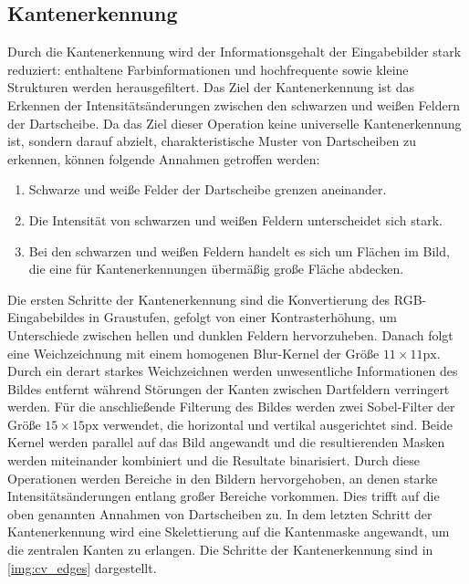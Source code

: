 
\subsection{Kantenerkennung}
\label{sec:impl:cv:edges}

Durch die Kantenerkennung wird der Informationsgehalt der Eingabebilder stark reduziert: enthaltene Farbinformationen und hochfrequente sowie kleine Strukturen werden herausgefiltert. Das Ziel der Kantenerkennung ist das Erkennen der Intensitätsänderungen zwischen den schwarzen und weißen Feldern der Dartscheibe. Da das Ziel dieser Operation keine universelle Kantenerkennung ist, sondern darauf abzielt, charakteristische Muster von Dartscheiben zu erkennen, können folgende Annahmen getroffen werden:

\begin{enumerate}
    \item Schwarze und weiße Felder der Dartscheibe grenzen aneinander.
    \item Die Intensität von schwarzen und weißen Feldern unterscheidet sich stark.
    \item Bei den schwarzen und weißen Feldern handelt es sich um Flächen im Bild, die eine für Kantenerkennungen übermäßig große Fläche abdecken.
\end{enumerate}

Die ersten Schritte der Kantenerkennung sind die Konvertierung des RGB-Eingabebildes in Graustufen, gefolgt von einer Kontrasterhöhung, um Unterschiede zwischen hellen und dunklen Feldern hervorzuheben. Danach folgt eine Weichzeichnung mit einem homogenen Blur-Kernel der Größe $11\times11\text{px}$. Durch ein derart starkes Weichzeichnen werden unwesentliche Informationen des Bildes entfernt während Störungen der Kanten zwischen Dartfeldern verringert werden. Für die anschließende Filterung des Bildes werden zwei Sobel-Filter der Größe $15\times15\text{px}$ verwendet, die horizontal und vertikal ausgerichtet sind. Beide Kernel werden parallel auf das Bild angewandt und die resultierenden Masken werden miteinander kombiniert und die Resultate binarisiert. Durch diese Operationen werden Bereiche in den Bildern hervorgehoben, an denen starke Intensitätsänderungen entlang großer Bereiche vorkommen. Dies trifft auf die oben genannten Annahmen von Dartscheiben zu. In dem letzten Schritt der Kantenerkennung wird eine Skelettierung auf die Kantenmaske angewandt, um die zentralen Kanten zu erlangen. Die Schritte der Kantenerkennung sind in \autoref{img:cv_edges} dargestellt.

